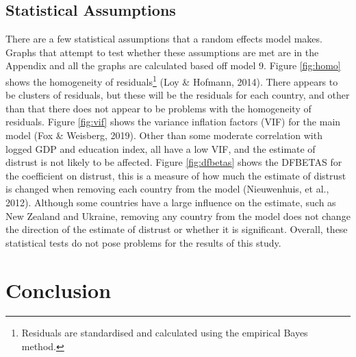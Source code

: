 \documentclass[
  12pt,
]{article}
\begin{document}
\hypertarget{statistical-assumptions}{%
\subsection{Statistical Assumptions}\label{statistical-assumptions}}

There are a few statistical assumptions that a random effects model makes. Graphs that attempt to test whether these assumptions are met are in the Appendix and all the graphs are calculated based off model 9. Figure \ref{fig:homo} shows the homogeneity of residuals\footnote{Residuals are standardised and calculated using the empirical Bayes method.} (Loy \& Hofmann, 2014). There appears to be clusters of residuals, but these will be the residuals for each country, and other than that there does not appear to be problems with the homogeneity of residuals. Figure \ref{fig:vif} shows the variance inflation factors (VIF) for the main model (Fox \& Weisberg, 2019). Other than some moderate correlation with logged GDP and education index, all have a low VIF, and the estimate of distrust is not likely to be affected. Figure \ref{fig:dfbetas} shows the DFBETAS for the coefficient on distrust, this is a measure of how much the estimate of distrust is changed when removing each country from the model (Nieuwenhuis, et al., 2012). Although some countries have a large influence on the estimate, such as New Zealand and Ukraine, removing any country from the model does not change the direction of the estimate of distrust or whether it is significant. Overall, these statistical tests do not pose problems for the results of this study.\\

\hypertarget{conclusion}{%
\section{Conclusion}\label{conclusion}}
\end{document}

